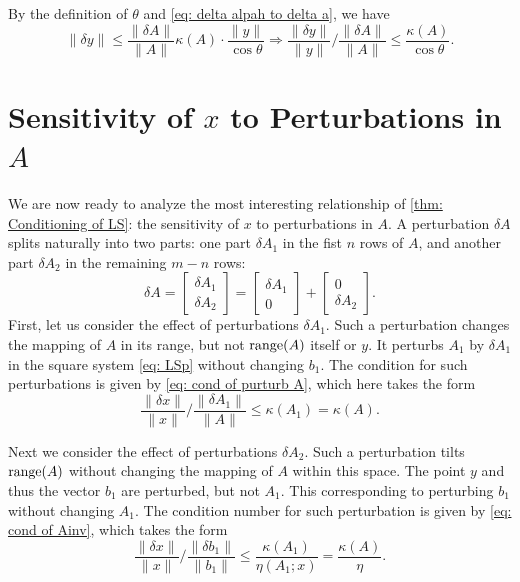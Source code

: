 By the definition of $\theta$ and \eqref{eq: delta alpah to delta a}, we have 
\begin{equation}
    \label{eq: sensi y to A} 
    \|\delta y\| \le \frac{ \|\delta A\|}{\|A\|}\kappa(A) \cdot \frac{\|y\|}{\cos \theta } \Rightarrow \frac{\|\delta y\|}{\|y\|}\Big / \frac{\|\delta A\|}{\|A\|} \le \frac{\kappa(A)}{\cos \theta }. 
\end{equation}

\section{Sensitivity of $x$ to Perturbations in $A$} 

We are now ready to analyze the most interesting relationship of \autoref{thm: Conditioning of LS}: the sensitivity of $x$ to perturbations in $A$. A perturbation $\delta A$ splits naturally into two parts: one part $\delta A_1$ in the fist $n$ rows of $A$, and another part $\delta  A_2$ in the remaining $m-n$ rows: 
\[
    \delta A=\left[\begin{array}{l}
        \delta A_1 \\
        \delta A_2
        \end{array}\right]=\left[\begin{array}{c}
        \delta A_1 \\
        0
        \end{array}\right]+\left[\begin{array}{c}
        0 \\
        \delta A_2
        \end{array}\right]. 
\]
First, let us consider the effect of perturbations $\delta A_1$. Such a perturbation changes the mapping of $A$ in its range, but not $\operatorname{range}(A)$ itself or $y$. It perturbs $A_1$ by $\delta A_1$ in the square system \eqref{eq: LSp} without changing $b_1$. The condition for such perturbations is given by \eqref{eq: cond of purturb A}, which here takes the form 
\begin{equation}
    \label{eq: delta A1} 
    \frac{\|\delta x\|}{\|x\|} / \frac{\left\|\delta A_1\right\|}{\|A\|} \leq \kappa\left(A_1\right)=\kappa(A). 
\end{equation}

Next we consider the effect of perturbations $\delta A_2$. Such a perturbation tilts $\operatorname{range}(A)$ without changing the mapping of $A$ within this space. The point $y$ and thus the vector $b_1$ are perturbed, but not $A_1$. This corresponding to perturbing $b_1$ without changing $A_1$. The condition number for such perturbation is given by \eqref{eq: cond of Ainv}, which takes the form 
\begin{equation}
    \frac{\|\delta x\|}{\|x\|} / \frac{\left\|\delta b_1\right\|}{\left\|b_1\right\|} \leq \frac{\kappa\left(A_1\right)}{\eta\left(A_1 ; x\right)}=\frac{\kappa(A)}{\eta} .
\end{equation}

